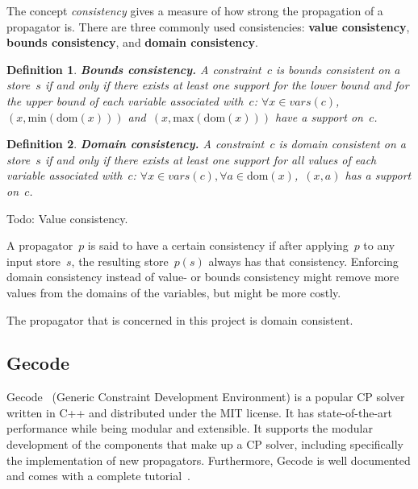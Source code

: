 \documentclass[a4paper,11pt]{article}
\newtheorem{definition}{Definition}
\newcommand{\Todo}[1]{{\color{blue}#1}}
\newcommand{\Dom}[1]{\text{dom}({#1})}
\numberwithin{equation}{section}
\begin{document}
The concept \emph{consistency} gives a measure of how strong
the propagation of a propagator is.
There are three commonly used consistencies:
\textbf{value consistency}, \textbf{bounds consistency}, and \textbf{domain consistency}.


\begin{definition}
  \textbf{Bounds consistency.} A constraint~$c$ is \emph{bounds consistent} on a store~$s$ 
  if and only if there exists at least one support for the lower bound 
  and for the upper bound of each variable associated
  with~$c$: $\forall x \in \mathit{vars}(c)$,~$(x,\text{min}(\Dom{x}))$
  and~$(x,\text{max}(\Dom{x}))$ 
  have a support on~$c$.
\end{definition}

\begin{definition}
  \textbf{Domain consistency.} A constraint~$c$ is \emph{domain consistent}
  on a store~$s$  if and only if there exists at least one support for all
  values of each variable associated with~$c$:
  $\forall x \in \mathit{vars}(c), \forall a \in \Dom{x}$,~$(x,a)$ 
  has a support on~$c$.
\end{definition}

\Todo{Todo: Value consistency}.



A propagator~$p$ is said to have a certain consistency
if after applying~$p$ to any input store~$s$, the resulting store~$p(s)$
always has that consistency. 
Enforcing domain consistency instead of value- or bounds consistency
might remove more values from the domains of the variables, but might be
more costly.

The propagator that is concerned in this project is domain consistent.

\subsection{Gecode}
\label{bg:gecode}
Gecode~\cite{Gecode} (Generic Constraint Development Environment)
is a popular CP solver written in C++ and
distributed under the MIT license.
It has state-of-the-art performance while being modular and extensible.
It supports the modular development of the components that make up a
CP solver, including specifically the implementation of new propagators.
Furthermore, Gecode is well documented and comes
with a complete tutorial~\cite{Gecode:MPG}.
\end{document}
